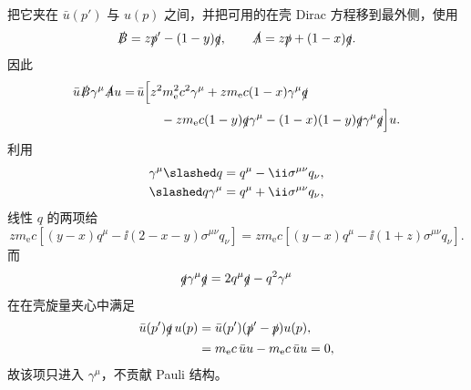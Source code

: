 \begin{derivation}
把它夹在 $\bar u(p')$ 与 $u(p)$ 之间，并把可用的在壳 Dirac 方程移到最外侧，使用
\begin{equation*}
 \slashed B=z\slashed p'-(1-y)\slashed q,
 \qquad
 \slashed A=z\slashed p+(1-x)\slashed q.
\end{equation*}
因此
\begin{align*}
 \bar u\slashed B\gamma^\mu\slashed A u
 =&\,\bar u\Bigl[
 z^2m_{\mathrm e}^2c^2\gamma^\mu
 +zm_{\mathrm e} c(1-x)\gamma^\mu\slashed q\\
 &\qquad-zm_{\mathrm e} c(1-y)\slashed q\gamma^\mu
 -(1-x)(1-y)\slashed q\gamma^\mu\slashed q
 \Bigr]u.
\end{align*}
利用
\begin{align*}
 \gamma^\mu\slashed q
 &=q^\mu-\ii\sigma^{\mu\nu}q_\nu,\\
 \slashed q\gamma^\mu
 &=q^\mu+\ii\sigma^{\mu\nu}q_\nu,
\end{align*}
线性 $q$ 的两项给
\begin{equation*}
 zm_{\mathrm e} c\left[(y-x)q^\mu
 -\ii(2-x-y)\sigma^{\mu\nu}q_\nu\right]
 =zm_{\mathrm e} c\left[(y-x)q^\mu
 -\ii(1+z)\sigma^{\mu\nu}q_\nu\right].
\end{equation*}
而
\begin{equation*}
 \slashed q\gamma^\mu\slashed q
 =2q^\mu\slashed q-q^2\gamma^\mu
\end{equation*}
在在壳旋量夹心中满足
\begin{align*}
 \bar u(p')\slashed q\,u(p)
 &=\bar u(p')(\slashed p'-\slashed p)u(p),\\
 &=m_{\mathrm e} c\,\bar uu-m_{\mathrm e} c\,\bar uu=0,
\end{align*}
故该项只进入 $\gamma^\mu$，不贡献 Pauli 结构。


\end{derivation}
